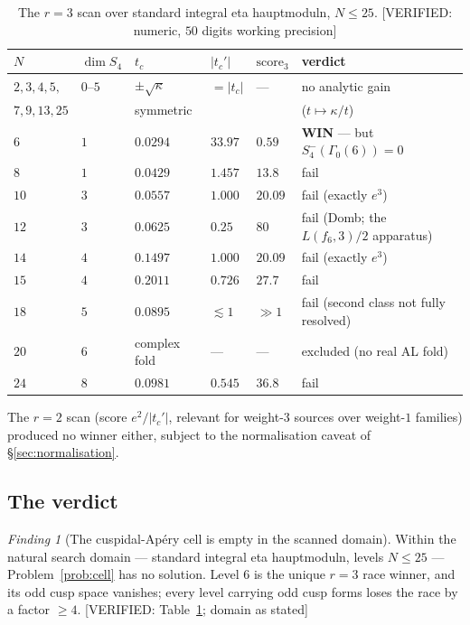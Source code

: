 \documentclass[11pt,reqno]{amsart}
\theoremstyle{plain}
\theoremstyle{definition}
\theoremstyle{remark}
\newtheorem{finding}[theorem]{Finding}
\newcommand{\tc}{t_c}
\newcommand{\tcp}{t_c'}
\newcommand{\Ga}{\Gamma_0}
\newcommand{\VerifiedR}[1]{\textup{\textsf{[VERIFIED: #1]}}}
\begin{document}
\begin{table}[h]
\centering
\renewcommand{\arraystretch}{1.2}
\begin{tabular}{@{}llllll@{}}
\toprule
$N$ & $\dim S_4$ & $\tc$ & $|\tcp|$ & $\mathrm{score}_3$ & verdict\\
\midrule
$2,3,4,5,$ & $0$--$5$ & $\pm\sqrt\kappa$ & $=|\tc|$ & --- & no analytic gain\\
$7,9,13,25$ & & symmetric & & & ($t\mapsto\kappa/t$)\\
$6$ & $1$ & $0.0294$ & $\mathbf{33.97}$ & $\mathbf{0.59}$ &
   \textbf{WIN} --- but $S_4^-(\Ga(6))=0$\\
$8$ & $1$ & $0.0429$ & $1.457$ & $13.8$ & fail\\
$10$ & $3$ & $0.0557$ & $1.000$ & $20.09$ & fail (exactly $e^3$)\\
$12$ & $3$ & $0.0625$ & $0.25$ & $80$ & fail (Domb; the $L(f_6,3)/2$ apparatus)\\
$14$ & $4$ & $0.1497$ & $1.000$ & $20.09$ & fail (exactly $e^3$)\\
$15$ & $4$ & $0.2011$ & $0.726$ & $27.7$ & fail\\
$18$ & $5$ & $0.0895$ & $\lesssim1$ & $\gg1$ & fail (second class not fully resolved)\\
$20$ & $6$ & complex fold & --- & --- & excluded (no real AL fold)\\
$24$ & $8$ & $0.0981$ & $0.545$ & $36.8$ & fail\\
\bottomrule
\end{tabular}
\medskip
\caption{The $r=3$ scan over standard integral eta hauptmoduln,
$N\le25$. \VerifiedR{numeric, $50$ digits working precision}}
\label{tab:scan}
\end{table}

The $r=2$ scan (score $e^2/|\tcp|$, relevant for weight-$3$ sources over
weight-$1$ families) produced no winner either, subject to the
normalisation caveat of \S\ref{sec:normalisation}.

\subsection{The verdict}

\begin{finding}[The cuspidal-Ap\'ery cell is empty in the scanned domain]
\label{find:verdict}
Within the natural search domain --- standard integral eta hauptmoduln,
levels $N\le25$ --- Problem~\ref{prob:cell} has no solution.
Level $6$ is the unique $r=3$ race winner, and its odd cusp space
vanishes; every level carrying odd cusp forms loses the race by a factor
$\ge 4$. \VerifiedR{Table~\ref{tab:scan}; domain as stated}
\end{finding}
\end{document}
